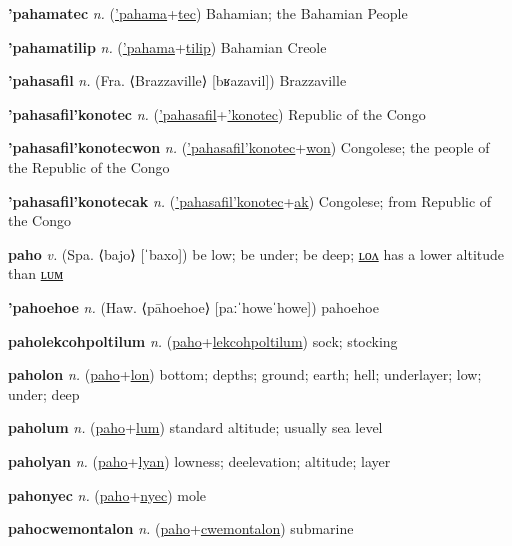 \textbf{\hypertarget{'pahamatec}{'pahamatec}} \textit{n.} (\hyperlink{'pahama}{'pahama}+\allowbreak \hyperlink{tec}{tec})
Bahamian; the Bahamian People

\textbf{\hypertarget{'pahamatilip}{'pahamatilip}} \textit{n.} (\hyperlink{'pahama}{'pahama}+\allowbreak \hyperlink{tilip}{tilip})
Bahamian Creole

\textbf{\hypertarget{'pahasafil}{'pahasafil}} \textit{n.} (Fra. ⟨Brazzaville⟩ [bʁazavil])
Brazzaville

\textbf{\hypertarget{'pahasafil'konotec}{'pahasafil'konotec}} \textit{n.} (\hyperlink{'pahasafil}{'pahasafil}+\allowbreak \hyperlink{'konotec}{'konotec})
Republic of the Congo

\textbf{\hypertarget{'pahasafil'konotecwon}{'pahasafil'konotecwon}} \textit{n.} (\hyperlink{'pahasafil'konotec}{'pahasafil'konotec}+\allowbreak \hyperlink{won}{won})
Congolese; the people of the Republic of the Congo

\textbf{\hypertarget{'pahasafil'konotecak}{'pahasafil'konotecak}} \textit{n.} (\hyperlink{'pahasafil'konotec}{'pahasafil'konotec}+\allowbreak \hyperlink{ak}{ak})
Congolese; from Republic of the Congo

\textbf{\hypertarget{paho}{paho}} \textit{v.} (Spa. ⟨bajo⟩ [ˈbaxo])
be low; be under; be deep; \hyperlink{paholon}{ʟᴏᴧ} has a lower altitude than \hyperlink{paholum}{ʟᴜᴍ}

\textbf{\hypertarget{'pahoehoe}{'pahoehoe}} \textit{n.} (Haw. ⟨pāhoehoe⟩ [paːˈhoweˈhowe])
pahoehoe

\textbf{\hypertarget{paholekcohpoltilum}{paholekcohpoltilum}} \textit{n.} (\hyperlink{paho}{paho}+\allowbreak \hyperlink{lekcohpoltilum}{lekcohpoltilum})
sock; stocking

\textbf{\hypertarget{paholon}{paholon}} \textit{n.} (\hyperlink{paho}{paho}+\allowbreak \hyperlink{lon}{lon})
bottom; depths; ground; earth; hell; underlayer; low; under; deep

\textbf{\hypertarget{paholum}{paholum}} \textit{n.} (\hyperlink{paho}{paho}+\allowbreak \hyperlink{lum}{lum})
standard altitude; usually sea level

\textbf{\hypertarget{paholyan}{paholyan}} \textit{n.} (\hyperlink{paho}{paho}+\allowbreak \hyperlink{lyan}{lyan})
lowness; deelevation; altitude; layer

\textbf{\hypertarget{pahonyec}{pahonyec}} \textit{n.} (\hyperlink{paho}{paho}+\allowbreak \hyperlink{nyec}{nyec})
mole

\textbf{\hypertarget{pahocwemontalon}{pahocwemontalon}} \textit{n.} (\hyperlink{paho}{paho}+\allowbreak \hyperlink{cwemontalon}{cwemontalon})
submarine

